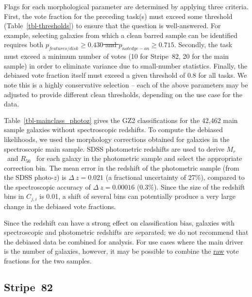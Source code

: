 \documentclass[useAMS,usenatbib]{mn2e}
\newcommand{\mr}{$M_r$}
\newcommand{\rfifty}{$R_{50}$}
\providecommand{\DIFaddtex}[1]{{\protect\color{blue}\uwave{#1}}} %
\providecommand{\DIFdeltex}[1]{{\protect\color{red}\sout{#1}}}                      %
\providecommand{\DIFaddbegin}{} %
\providecommand{\DIFaddend}{} %
\providecommand{\DIFdelbegin}{} %
\providecommand{\DIFdelend}{} %
\providecommand{\DIFadd}[1]{\texorpdfstring{\DIFaddtex{#1}}{#1}} %
\providecommand{\DIFdel}[1]{\texorpdfstring{\DIFdeltex{#1}}{}} %
\begin{document}
Flags for each morphological parameter are determined by applying three criteria. First, the vote fraction for the preceding task(s) must exceed some threshold (Table~\ref{tbl-thresholds}) to ensure that the question is well-answered. For example, selecting galaxies from which a clean barred sample can be identified requires both \DIFdelbegin \DIFdel{$p_{features/disk}\geq0.430$ and $p_{not edge-on}\geq0.715$}\DIFdelend \DIFaddbegin \DIFadd{$p_\mathrm{features/disk}\geq0.430$ and $p_\mathrm{not edge-on}\geq0.715$}\DIFaddend . Secondly, the task must exceed a minimum number of votes (10 for Stripe~82, 20 for the main sample) in order to eliminate variance due to small-number statistics. Finally, the debiased vote fraction itself must exceed a given threshold of 0.8 for all tasks. We note this is a highly conservative selection -- each of the above parameters may be adjusted to provide different clean thresholds, depending on the use case for the data.%

Table~\ref{tbl-mainclass_photoz} gives the GZ2 classifications for the 42,462 main sample galaxies without spectroscopic redshifts. To compute the debiased likelihoods, we used the morphology corrections obtained for galaxies in the spectroscopic main sample. SDSS photometric redshifts \citep{csa03} are used to derive \mr~and \rfifty~ for each galaxy in the photometric sample and select the appropriate correction bin. The mean error in the redshift of the photometric sample (from the SDSS photo-$z$) is $\Delta~z=0.021$ (a fractional uncertainty of 27\%), compared to the spectroscopic accuracy of $\Delta~z=0.00016$ (0.3\%). Since the size of the redshift bins in $C_{j,i}$ is 0.01, a shift of several bins can potentially produce a very large change in the debiased vote fractions. 

Since the redshift can have a strong effect on classification bias, galaxies with spectroscopic and photometric redshifts are separated; we do not recommend that the debiased data be combined for analysis. For use cases where the main driver is the number of galaxies, however, it may be possible to combine the \underline{raw} vote fractions for the two samples.

\subsection{Stripe~82}\label{ssec-s82}
\end{document}
